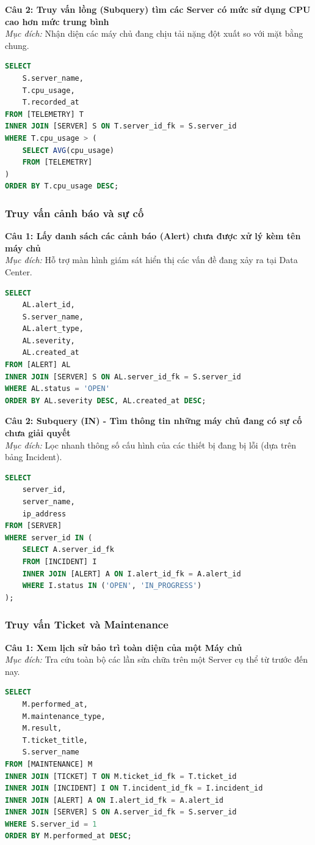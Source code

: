 \noindent \textbf{Câu 2: Truy vấn lồng (Subquery) tìm các Server có mức sử dụng CPU cao hơn mức trung bình} \\
\textit{Mục đích:} Nhận diện các máy chủ đang chịu tải nặng đột xuất so với mặt bằng chung.
\begin{lstlisting}[language=SQL]
SELECT
    S.server_name,
    T.cpu_usage,
    T.recorded_at
FROM [TELEMETRY] T
INNER JOIN [SERVER] S ON T.server_id_fk = S.server_id
WHERE T.cpu_usage > (
    SELECT AVG(cpu_usage)
    FROM [TELEMETRY]
)
ORDER BY T.cpu_usage DESC;
\end{lstlisting}

\subsubsection{Truy vấn cảnh báo và sự cố}
\noindent \textbf{Câu 1: Lấy danh sách các cảnh báo (Alert) chưa được xử lý kèm tên máy chủ} \\
\textit{Mục đích:} Hỗ trợ màn hình giám sát hiển thị các vấn đề đang xảy ra tại Data Center.
\begin{lstlisting}[language=SQL]
SELECT
    AL.alert_id,
    S.server_name,
    AL.alert_type,
    AL.severity,
    AL.created_at
FROM [ALERT] AL
INNER JOIN [SERVER] S ON AL.server_id_fk = S.server_id
WHERE AL.status = 'OPEN'
ORDER BY AL.severity DESC, AL.created_at DESC;
\end{lstlisting}

\noindent \textbf{Câu 2: Subquery (IN) - Tìm thông tin những máy chủ đang có sự cố chưa giải quyết} \\
\textit{Mục đích:} Lọc nhanh thông số cấu hình của các thiết bị đang bị lỗi (dựa trên bảng Incident).
\begin{lstlisting}[language=SQL]
SELECT
    server_id,
    server_name,
    ip_address
FROM [SERVER]
WHERE server_id IN (
    SELECT A.server_id_fk
    FROM [INCIDENT] I
    INNER JOIN [ALERT] A ON I.alert_id_fk = A.alert_id
    WHERE I.status IN ('OPEN', 'IN_PROGRESS')
);
\end{lstlisting}

\subsubsection{Truy vấn Ticket và Maintenance}
\noindent \textbf{Câu 1: Xem lịch sử bảo trì toàn diện của một Máy chủ} \\
\textit{Mục đích:} Tra cứu toàn bộ các lần sửa chữa trên một Server cụ thể từ trước đến nay.
\begin{lstlisting}[language=SQL]
SELECT
    M.performed_at,
    M.maintenance_type,
    M.result,
    T.ticket_title,
    S.server_name
FROM [MAINTENANCE] M
INNER JOIN [TICKET] T ON M.ticket_id_fk = T.ticket_id
INNER JOIN [INCIDENT] I ON T.incident_id_fk = I.incident_id
INNER JOIN [ALERT] A ON I.alert_id_fk = A.alert_id
INNER JOIN [SERVER] S ON A.server_id_fk = S.server_id
WHERE S.server_id = 1
ORDER BY M.performed_at DESC;
\end{lstlisting}

